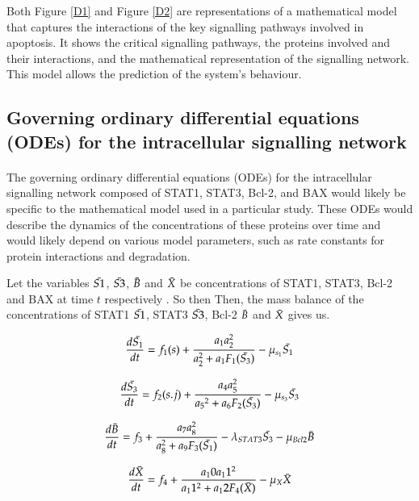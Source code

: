 Both Figure \ref{D1} and Figure \ref{D2} are representations of a mathematical model that captures the interactions of the key signalling pathways involved in apoptosis. It shows the critical signalling pathways, the proteins involved and their interactions, and the mathematical representation of the signalling network. This model allows the prediction of the system's behaviour.

\subsection{Governing ordinary differential equations (ODEs) for the intracellular signalling network}

\paragraph{}
The governing ordinary differential equations (ODEs) for the intracellular signalling network composed of STAT1, STAT3, Bcl-2, and BAX would likely be specific to the mathematical model used in a particular study. These ODEs would describe the dynamics of the concentrations of these proteins over time and would likely depend on various model parameters, such as rate constants for protein interactions and degradation.

 Let the variables $\Bar{S1}$, $\Bar{S3}$, $\Bar{B}$ and $\Bar{X}$ be concentrations of STAT1, STAT3, Bcl-2 and BAX at time $t$ respectively \cite{lee2021mathematical}. So then Then, the mass balance of the concentrations of STAT1 $\Bar{S1}$,  STAT3 $\Bar{S3}$, Bcl-2 $\Bar{B}$ and $\Bar{X}$ gives us. 

 
\begin{equation}
\label{a}
     \frac{d\Bar{S_1}}{dt} = f_{1} (s)+ \frac{ a_1a_2^2} {a_2^2+a_1F_1(\Bar{S_3})} - \mu_{s_{1}}\Bar{S_1 } 
\end{equation}

\begin{equation}
\label{b}
\frac{d\Bar{S_3}}{dt} = f_{2} (s.j)  +\frac{a_4a_5^2} {{a_5}^2+ a_6F_2({\Bar{S_3})}}-\mu_{s_{3}}\Bar{S_3} 
\end{equation}

\begin{equation}
\label{c}
\frac{d\Bar{B}}{dt} = f_3+ \frac{a_7a_8^2}{a_8^2+a_9F_3(\Bar{S_1})} -  \lambda_{STAT3} \Bar{S_3} - \mu_{Bcl2} \Bar{B} 
\end{equation}
 
\begin{equation}
\label{d}
    \frac{d \Bar{X}}{dt}= f_4 + \frac{a_10a_11^2}{a_11^2+a_12F_4(\Bar{X})} -\mu_X \Bar{X} 
\end{equation}


